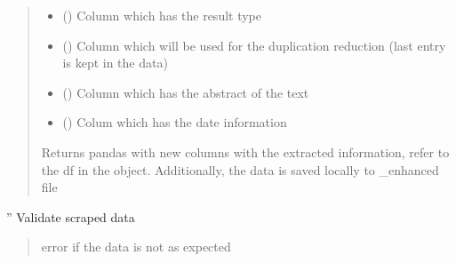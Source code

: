 \documentclass[letterpaper,10pt,english]{sphinxmanual}
\begin{document}
\begin{fulllineitems}
\begin{fulllineitems}
\begin{quote}
\begin{description}
\begin{itemize}
\item {} 
\sphinxAtStartPar
{} () \textendash{} Column which has the result type

\item {} 
\sphinxAtStartPar
{} () \textendash{} Column which will be used for the duplication reduction (last entry is kept in the data)

\item {} 
\sphinxAtStartPar
{} () \textendash{} Column which has the abstract of the text

\item {} 
\sphinxAtStartPar
{} () \textendash{} Colum which has the date information

\end{itemize}

\sphinxAtStartPar
Returns pandas with new columns with the extracted information, refer to the df in the object. Additionally, the data is saved locally to \_enhanced file

\end{description}\end{quote}

\end{fulllineitems}


\begin{fulllineitems}
\label{\detokenize{BeeLitReview:BeeLitReview.BeeLitReview.validate_scraped_csv}}
\pysigstartsignatures
{}
\pysigstopsignatures
\sphinxAtStartPar
”
Validate scraped data
\begin{quote}\begin{description}
\sphinxAtStartPar
error if the data is not as expected

\end{description}\end{quote}

\end{fulllineitems}


\end{fulllineitems}
\end{document}
